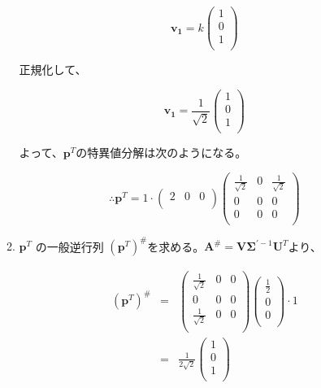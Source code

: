 \begin{enumerate}
\begin{enumerate}
\[
\mathbf{v_1}
=
k
\left(
\begin{array}{c}
1 \\
0 \\
1 \\
\end{array}
\right)
\]

正規化して、

\[
\mathbf{v_1}
=
\frac{1}{\sqrt{2}}
\left(
\begin{array}{c}
1 \\
0 \\
1 \\
\end{array}
\right)
\]

よって、\({\mathbf p}^T\)の特異値分解は次のようになる。

\[\therefore {\mathbf p}^T = 1 \cdot
\left(
\begin{array}{ccc}
2 & 0 & 0 \\
\end{array}
\right)
\left(
\begin{array}{ccc}
\frac{1}{\sqrt{2}} & 0 & \frac{1}{\sqrt{2}} \\
0 & 0 & 0 \\
0 & 0 & 0 \\
\end{array}
\right)
\]

\item \({\mathbf p}^T\) の一般逆行列 \(({\mathbf p}^T)^\#\)を求める。\({\mathbf A}^\# = {\mathbf V}{\mathbf \Sigma}^{\prime -1}{\mathbf U}^T\)より、

\begin{eqnarray*}
({\mathbf p}^T)^\# & = & 
\left(
\begin{array}{ccc}
\frac{1}{\sqrt{2}} & 0 & 0 \\
0 & 0 & 0 \\
\frac{1}{\sqrt{2}} & 0 & 0 \\
\end{array}
\right)
\left(
\begin{array}{c}
\frac{1}{2} \\
0 \\ 
0 \\
\end{array}
\right) \cdot 1\\
 & = & 
\frac{1}{2\sqrt{2}} 
\left(
\begin{array}{c}
1 \\
0 \\
1 \\
\end{array}
\right) \\
\end{eqnarray*}


\end{enumerate}
\end{enumerate}
